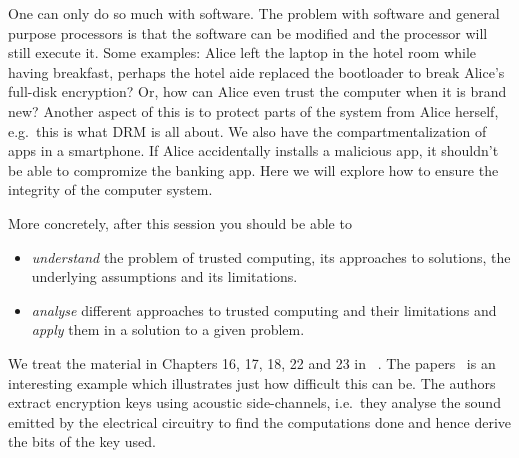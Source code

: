 One can only do so much with software.
The problem with software and general purpose processors is that the software 
can be modified and the processor will still execute it.
Some examples: Alice left the laptop in the hotel room while having breakfast, 
perhaps the hotel aide replaced the bootloader to break Alice's full-disk 
encryption?
Or, how can Alice even trust the computer when it is brand new?
Another aspect of this is to protect parts of the system from Alice herself, 
e.g.\ this is what \ac{DRM} is all about.
We also have the compartmentalization of apps in a smartphone.
If Alice accidentally installs a malicious app, it shouldn't be able to 
compromize the banking app.
Here we will explore how to ensure the integrity of the computer system.

More concretely, after this session you should be able to
\begin{itemize}
  \item \emph{understand} the problem of trusted computing, its approaches to 
    solutions, the underlying assumptions and its limitations.
  \item \emph{analyse} different approaches to trusted computing and their 
    limitations and \emph{apply} them in a solution to a given problem.
\end{itemize}

We treat the material in Chapters 16, 17, 18, 22 and 23 in 
~\cite{Anderson2008sea}.
The papers~\cite{%
  VoltageKeyExtraction,AcousticKeyExtraction,ElectromagneticKeyExtraction%
} is an interesting example which illustrates just how difficult this can be.
The authors extract encryption keys using acoustic side-channels, i.e.\ they 
analyse the sound emitted by the electrical circuitry to find the computations 
done and hence derive the bits of the key used.
